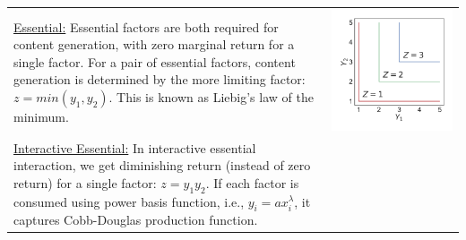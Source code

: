 \begin{table}[h!]
  \centering
  \begin{tabular}{m{}c}
    \vspace{-10pt}
    \uline{Essential:} Essential factors are both required for content generation, with zero marginal return for a single factor. For a pair of essential factors, content generation is determined by the more limiting factor: $z = min(y_1, y_2)$. This is known as Liebig's law of the minimum.
    &
    \begin{minipage}{.17\textwidth}
      \includegraphics[width=\textwidth, height=\textwidth]{Figures/Essential.pdf}
    \end{minipage}
    \\ 
    \vspace{-10pt}
    \uline{Interactive Essential:} In interactive essential interaction, we get diminishing return (instead of zero return) for a single factor: $z = y_1y_2$. If each factor is consumed using power basis function, i.e., $y_i = ax^\lambda_i$, it captures Cobb-Douglas production function.

\end{tabular}
\end{table}
